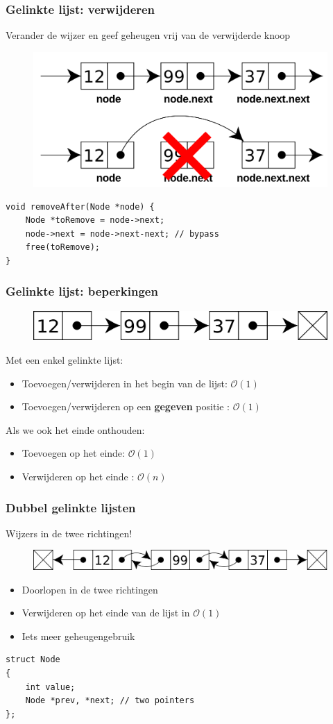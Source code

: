 \documentclass[12pt]{beamer}
\newcommand{\bigoh}[1]{\mathcal{O}\left(#1\right)}
\newcommand{\constant}{\bigoh{1}}
\newcommand{\linear}{\bigoh{n}}
\begin{document}
\begin{frame}[fragile]
\frametitle{Gelinkte lijst: verwijderen}
Verander de wijzer en geef geheugen vrij van de verwijderde knoop
\begin{figure}
\centering
\includegraphics[width=.6\textwidth]{img/remove-node}
\end{figure}
\begin{lstlisting}
void removeAfter(Node *node) {
    Node *toRemove = node->next;
    node->next = node->next-next; // bypass
    free(toRemove);
}
\end{lstlisting}
\end{frame}

\begin{frame}[fragile]
\frametitle{Gelinkte lijst: beperkingen}
\begin{figure}
\centering
\includegraphics[width=.8\textwidth]{img/singly-linked}
\end{figure}
Met een enkel gelinkte lijst:
\begin{itemize}
\item Toevoegen/verwijderen in het begin van de lijst: $\constant$
\item Toevoegen/verwijderen op een \textbf{gegeven} positie : $\constant$
\end{itemize}
Als we ook het einde onthouden:
\begin{itemize}
\item Toevoegen op het einde: $\constant$
\item Verwijderen op het einde : $\linear$
\end{itemize}
\end{frame}

\begin{frame}[fragile]
\frametitle{Dubbel gelinkte lijsten}
Wijzers in de twee richtingen!
\begin{figure}
\centering
\includegraphics[width=.8\textwidth]{img/doubly-linked}
\end{figure}
\begin{itemize}
\item Doorlopen in de twee richtingen
\item Verwijderen op het einde van de lijst in $\constant$
\item Iets meer geheugengebruik
\end{itemize}
\begin{lstlisting}
struct Node
{
    int value;
    Node *prev, *next; // two pointers
};
\end{lstlisting}
\end{frame}
\end{document}
